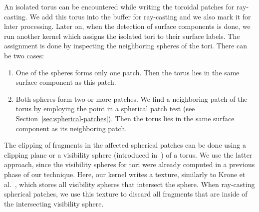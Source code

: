 An isolated torus can be encountered while writing the toroidal patches for ray-casting.
We add this torus into the buffer for ray-casting and we also mark it for later processing.
Later on, when the detection of surface components is done, we run another kernel which assigns the isolated tori to their surface labels.
The assignment is done by inspecting the neighboring spheres of the tori.
There can be two cases:
\begin{enumerate}
  \item One of the spheres forms only one patch. Then the torus lies in the same surface component as this patch.
	\item Both spheres form two or more patches. We find a neighboring patch of the torus by employing the point in a spherical patch test (see Section~\ref{sec:spherical-patches}). Then the torus lies in the same surface component as its neighboring patch.
\end{enumerate}

The clipping of fragments in the affected spherical patches can be done using a clipping plane or a visibility sphere (introduced in~\cite{krone2009interactive}) of a torus.
We use the latter approach, since the visibility spheres for tori were already computed in a previous phase of our technique.
Here, our kernel writes a texture, similarly to Krone et al.~\cite{krone2011parallel}, which stores all visibility spheres that intersect the sphere.
When ray-casting spherical patches, we use this texture to discard all fragments that are inside of the intersecting visibility sphere.
